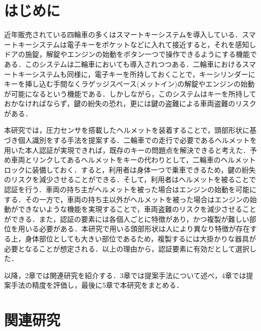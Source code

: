 \documentclass[Japanese]{dicomopapers}
\begin{document}
\section{はじめに}
近年販売されている四輪車の多くはスマートキーシステムを導入している．スマートキーシステムは電子キーをポケットなどに入れて接近すると，それを感知しドアの施錠，解錠やエンジンの始動をボタン一つで操作できるようにする機能である．このシステムは二輪車においても導入されつつある．二輪車におけるスマートキーシステムも同様に，電子キーを所持しておくことで，キーシリンダーにキーを挿し込む手間なくラゲッジスペース(メットイン)の解錠やエンジンの始動が可能になるという機能である．しかしながら，このシステムはキーを所持しておかなければならず，鍵の紛失の恐れ，更には鍵の盗難による車両盗難のリスクがある．\par
本研究では，圧力センサを搭載したヘルメットを装着することで，頭部形状に基づき個人識別をする手法を提案する．二輪車での走行で必要であるヘルメットを用いた本人認証が実現できれば，既存のキーの問題点を解決できると考えた．予め車両とリンクしてあるヘルメットをキーの代わりとして，二輪車のヘルメットロックに装備しておく．すると，利用者は身体一つで乗車できるため，鍵の紛失のリスクを減少させることができる．そして，利用者はヘルメットを被ることで認証を行う．車両の持ち主がヘルメットを被った場合はエンジンの始動を可能にする．その一方で，車両の持ち主以外がヘルメットを被った場合はエンジンの始動ができないような機能を実現することで，車両盗難のリスクを減少させることができる．また，認証の要素には各個人ごとに特徴があり，かつ複製が難しい部位を用いる必要がある．本研究で用いる頭部形状は人により異なり特徴が存在する上，身体部位としても大きい部位であるため，複製するには大掛かりな器具が必要となることが想定される．以上の理由から，認証要素に有効だとして選択した．\par
以降，2章では関連研究を紹介する．3章では提案手法について述べ，4章では提案手法の精度を評価し，最後に5章で本研究をまとめる．

\section{関連研究}
\end{document}
